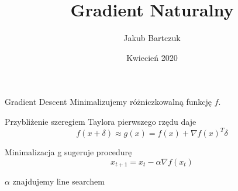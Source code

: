 \documentclass[unknownkeysallowed]{beamer}
\title{Gradient Naturalny}
\subtitle{}
\author{Jakub Bartczuk}
\date{Kwiecień 2020}
\begin{document}
\maketitle

\newcommand{\gradfx}{\nabla f(x)}
\newcommand{\gradloglikelihood}[1]{\nabla_{\theta} log p_{\theta}(#1)}
\newcommand{\naturalgrad}{\widetilde{\nabla}_{\theta}J}
\newcommand{\fisher}{\mathbf{F}}
\begin{frame}{Gradient Descent}
  Minimalizujemy różniczkowalną funkcję $f$.

  Przybliżenie szeregiem Taylora pierwszego rzędu daje
  $$f(x + \delta) \approx g(x) = f(x) + \gradfx^T \delta $$

  Minimalizacja g sugeruje procedurę 
  $$x_{t+1} = x_t - \alpha \nabla f(x_t)$$

  $\alpha$ znajdujemy line searchem

\end{frame}
\end{document}
